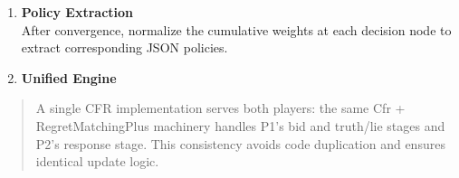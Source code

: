 \documentclass[
]{article}
\begin{document}
\begin{enumerate}
\begin{itemize}
    \begin{enumerate}
    \def\labelenumii{\arabic{enumii}.}
    \item
      \textbf{Next Strategy}: Call cfr1.next\_strategy() and
      cfr2.next\_strategy(), yielding realization-probability vectors.
      These are mappings from each decision sequence to the probability
      of reaching that sequence under the current mixed strategy.
    \item
      \textbf{Accumulate}: Add these (weighted by t) to cum1/cum2 to
      form the running average.
    \item
      \textbf{Utility Computation}: Compute counterfactual utility
      vectors u1 and u2 with the opponent's current strategy.
    \item
      \textbf{Regret Update}: Call cfr1.observe\_utility(u1) and
      cfr2.observe\_utility(u2) to update cumulative regrets at each
      node.
    \end{enumerate}
  \end{itemize}
\item
  \textbf{Policy Extraction\\
  }After convergence, normalize the cumulative weights at each decision
  node to extract corresponding JSON policies.
\item
  \textbf{Unified Engine}
\end{enumerate}

\begin{quote}
A single CFR implementation serves both players: the same Cfr +
RegretMatchingPlus machinery handles P1's bid and truth/lie stages and
P2's response stage. This consistency avoids code duplication and
ensures identical update logic.
\end{quote}
\end{document}
